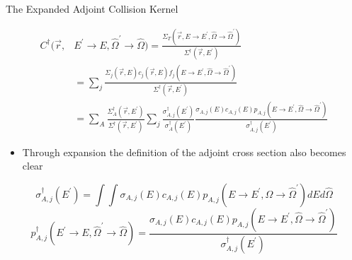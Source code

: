 \documentclass{beamer}
\begin{document}
\begin{frame}{The Expanded Adjoint Collision Kernel}
  
  \begin{align}
    C^{\dagger}(\vec{r},&E^{'} \to E,\hat{\Omega}^{'} \to \hat{\Omega}) =
    \frac{\Sigma_T(\vec{r},E \to E^{'},\hat{\Omega} \to \hat{\Omega}^{'})}
         {\Sigma^{\dagger}(\vec{r},E^{'})} \nonumber \\
         & = \sum_j 
         \frac{\Sigma_{j}(\vec{r},E)c_j(\vec{r},E)
           f_j(E \to E^{'},\hat{\Omega} \to \hat{\Omega}^{'})}
              {\Sigma^{\dagger}(\vec{r},E^{'})} \nonumber \\
              & = \sum_A \frac{\Sigma_A^{\dagger}(\vec{r},E^{'})}
              {\Sigma^{\dagger}(\vec{r},E^{'})}
              \sum_j \frac{\sigma_{A,j}^{\dagger}(E^{'})}{\sigma_A^{\dagger}(E^{'})}
              \frac{\sigma_{A,j}(E) c_{A,j}(E) 
                p_{A,j}(E \to E^{'},\hat{\Omega} \to \hat{\Omega}^{'})}
                   {\sigma_{A,j}^{\dagger}(E^{'})} \nonumber
  \end{align}

  \medskip

  \begin{itemize}
    \item Through expansion the definition of the adjoint cross section also 
      becomes clear
  \end{itemize}
  \begin{equation*}
    \sigma_{A,j}^{\dagger}(E^{'}) = \int\int
    \sigma_{A,j}(E)c_{A,j}(E) 
    p_{A,j}(E \to E^{'},\hat{\Omega} \to \hat{\Omega}^{'}) dE d\hat{\Omega}
  \end{equation*}
  \begin{equation*}
    p_{A,j}^{\dagger}(E^{'} \to E,\hat{\Omega}^{'} \to \hat{\Omega}) = 
    \frac{\sigma_{A,j}(E)c_{A,j}(E) 
      p_{A,j}(E \to E^{'},\hat{\Omega} \to \hat{\Omega}^{'})}
         {\sigma_{A,j}^{\dagger}(E^{'})}
  \end{equation*}
      
\end{frame}
\end{document}
